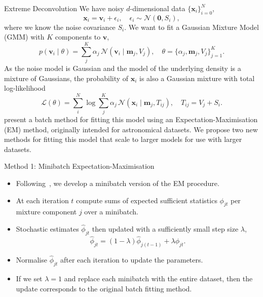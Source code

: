 \documentclass[final]{beamer}
\newlength{\colwidth}
\newcommand{\bx}{\mathbf{x}}
\newcommand{\bv}{\mathbf{v}}
\newcommand{\bm}{\mathbf{m}}
\begin{document}
\begin{frame}[t]
\begin{columns}[t]
\begin{column}{\colwidth}
    \begin{block}{Extreme Deconvolution}
        We have noisy $d$-dimensional data $\{\bx_i\}_{i=0}^N$,
        \begin{equation}
            \bx_i = \bv_i + \epsilon_i,\quad  \epsilon_i \sim \mathcal{N}(\mathbf{0}, S_i),
        \end{equation}
        where we know the noise covariance $S_i$.
        We want to fit a Gaussian Mixture Model (GMM) with $K$ components to $\bv$,
        \begin{equation}
        p(\bv_i \mid \theta) = \sum_j^K \alpha_j \,\mathcal{N}(\bv_i \mid \bm_j, V_j), \quad \theta = \{\alpha_j, \bm_j, V_j\}_{j=1} ^ K.
        \end{equation}
        As the noise model is Gaussian and the model of the underlying density is a mixture of Gaussians, the probability of $\bx_i$ is also a Gaussian mixture with total log-likelihood
        \begin{equation}
        \mathcal{L}(\theta) = \sum_i^N \log \sum_j^K \alpha_j\,\mathcal{N}(\bx_i \mid \bm_j, T_{ij}), \quad T_{ij} = V_j + S_i.
        \end{equation}
        \citet{bovyExtremeDeconvolutionInferring2011} present a batch method for fitting this model using an Expectation-Maximisation (EM) method, originally intended for astronomical datasets.
        We propose two new methods for fitting this model that scale to larger models for use with larger datasets.
    \end{block}

    \begin{block}{Method 1: Minibatch Expectation-Maximisation}
        \begin{itemize}
        \item Following~\citet{cappeOnlineExpectationMaximization2009}, we develop a minibatch version of the EM procedure.
        \item At each iteration $t$ compute sums of expected sufficient statistics $\phi_{jt}$ per mixture component $j$ over a minibatch.
        \item Stochastic estimates $\hat{\phi}_{jt}$ then updated with a sufficiently small step size $\lambda$,
        \begin{equation}
        \hat{\phi}_{jt} = (1 - \lambda)\hat{\phi}_{j(t-1)} + \lambda \phi_{jt}.
        \end{equation}
        \item Normalise $\hat{\phi}_{jt}$ after each iteration to update the parameters.
        \item If we set $\lambda=1$ and replace each minibatch with the entire dataset, then the update corresponds to the original batch fitting method.
        \end{itemize}
    \end{block}


\end{column}
\end{columns}
\end{frame}
\end{document}
